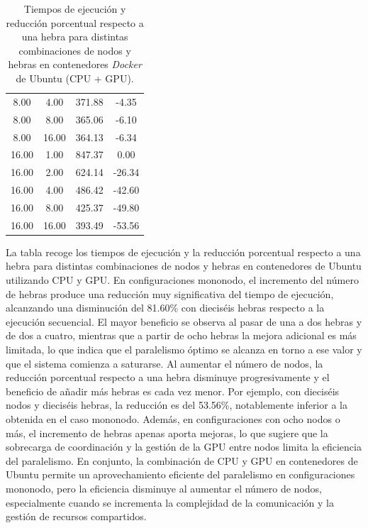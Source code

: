 \begin{table}[ht]
\begin{tabular}{|c|c|c|c|}
        8.00           & 4.00            & 371.88              & -4.35                          \\
        8.00           & 8.00            & 365.06              & -6.10                          \\
        8.00           & 16.00           & 364.13              & -6.34                          \\
        16.00          & 1.00            & 847.37              & 0.00                           \\
        16.00          & 2.00            & 624.14              & -26.34                         \\
        16.00          & 4.00            & 486.42              & -42.60                         \\
        16.00          & 8.00            & 425.37              & -49.80                         \\
        16.00          & 16.00           & 393.49              & -53.56                         \\
        \hline
    \end{tabular}
    \caption{Tiempos de ejecución y reducción porcentual respecto a una hebra para distintas combinaciones de nodos y hebras en contenedores \textit{Docker} de Ubuntu (CPU + GPU).}
    \label{tab:thread_sweep_ubuntu_\textit{Docker}_gpu_time}
\end{table}

La tabla recoge los tiempos de ejecución y la reducción porcentual respecto a una hebra para distintas combinaciones de nodos y hebras en contenedores de Ubuntu utilizando CPU y GPU. En configuraciones mononodo, el incremento del número de hebras produce una reducción muy significativa del tiempo de ejecución, alcanzando una disminución del 81.60\% con dieciséis hebras respecto a la ejecución secuencial. El mayor beneficio se observa al pasar de una a dos hebras y de dos a cuatro, mientras que a partir de ocho hebras la mejora adicional es más limitada, lo que indica que el paralelismo óptimo se alcanza en torno a ese valor y que el sistema comienza a saturarse. Al aumentar el número de nodos, la reducción porcentual respecto a una hebra disminuye progresivamente y el beneficio de añadir más hebras es cada vez menor. Por ejemplo, con dieciséis nodos y dieciséis hebras, la reducción es del 53.56\%, notablemente inferior a la obtenida en el caso mononodo. Además, en configuraciones con ocho nodos o más, el incremento de hebras apenas aporta mejoras, lo que sugiere que la sobrecarga de coordinación y la gestión de la GPU entre nodos limita la eficiencia del paralelismo. En conjunto, la combinación de CPU y GPU en contenedores de Ubuntu permite un aprovechamiento eficiente del paralelismo en configuraciones mononodo, pero la eficiencia disminuye al aumentar el número de nodos, especialmente cuando se incrementa la complejidad de la comunicación y la gestión de recursos compartidos.

